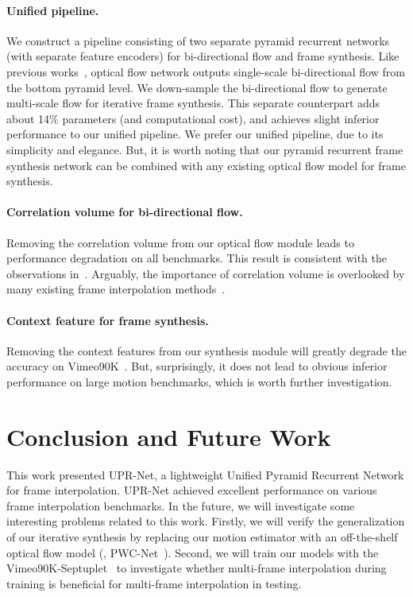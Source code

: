 \documentclass[10pt,twocolumn,letterpaper]{article}
\begin{document}
\paragraph{Unified pipeline.} We construct a pipeline consisting of two separate
pyramid recurrent networks (with separate feature encoders) for bi-directional
flow and frame synthesis.  Like previous
works~\cite{sim2021xvfi,jin2022enhanced}, optical flow network outputs
single-scale bi-directional flow from the bottom pyramid level.  We down-sample
the bi-directional flow to generate multi-scale flow for iterative frame
synthesis. This separate counterpart adds about 14\% parameters (and
computational cost), and achieves slight inferior performance to our unified
pipeline. We prefer our unified pipeline, due to its simplicity and elegance.
But, it is worth noting that our pyramid recurrent frame synthesis
network can be combined with any existing optical flow model for frame
synthesis. 





\paragraph{Correlation volume for bi-directional flow.} Removing the correlation
volume from our optical flow module leads to performance degradation on all
benchmarks. This result is consistent with the observations
in~\cite{jin2022enhanced}. Arguably, the importance of correlation volume is
overlooked by many existing frame interpolation
methods~\cite{zhang2020flexible,sim2021xvfi,huang2020rife}.


\paragraph{Context feature for frame synthesis.} Removing the context features
from our synthesis module will greatly degrade the accuracy on
Vimeo90K~\cite{xue2019video}. But, surprisingly, it does not lead to obvious
inferior performance on large motion benchmarks, which is worth further
investigation.










\section{Conclusion and Future Work}
\label{sec:conclusion}

This work presented UPR-Net, a lightweight Unified Pyramid Recurrent Network for
frame interpolation. UPR-Net achieved excellent performance on various frame
interpolation benchmarks. In the future, we will investigate some
interesting problems related to this work. Firstly, we will verify the
generalization of our iterative synthesis by replacing our motion estimator with
an off-the-shelf optical flow model (\eg, PWC-Net~\cite{sun2018pwc}). Second, we
will train our models with the Vimeo90K-Septuplet~\cite{xue2019video} to
investigate whether multi-frame interpolation during training is beneficial for
multi-frame interpolation in testing.


{\small


}
\end{document}
